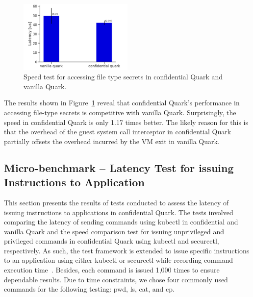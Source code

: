 \begin{figure}[!htb]
    \centering
    \includegraphics[width=0.5\textwidth]{images/reading_speed_of_file_type_secrets_in_Baseline_and_Cquark.PNG}
    \caption[Speed test for accessing file type secrets in confidential Quark and vanilla Quark]{Speed test for accessing file type secrets in confidential Quark and vanilla Quark.}
    \label{fig:reading_speed_of_file_type_secrets_in_Baseline_and_Cquark}
\end{figure}

The results shown in Figure~\ref{fig:reading_speed_of_file_type_secrets_in_Baseline_and_Cquark} reveal that confidential Quark's performance in accessing file-type secrets is competitive with vanilla Quark. Surprisingly, the speed in 
confidential Quark is only 1.17 times better. The likely reason for this is that the overhead of the guest system call interceptor in confidential Quark partially offsets the overhead incurred by the VM exit in vanilla Quark.

\subsection{Micro-benchmark – Latency Test for issuing Instructions to Application}\label{bench_issuing_Instructions}

This section presents the results of tests conducted to assess the latency of issuing instructions to applications in confidential Quark. The tests involved comparing the latency of sending commands using kubectl in confidential and vanilla Quark and the speed comparison test for issuing 
unprivileged and privileged commands in confidential Quark using kubectl and securectl, respectively. As such, the test framework is extended to issue specific instructions to an application using either kubectl or securectl while recording command execution time~\cite*{benchamark_perf_kubectl}. 
Besides, each command is issued 1,000 times to ensure dependable results. Due to time constraints, we chose four commonly used commands for the following testing: pwd, ls, cat, and cp.



